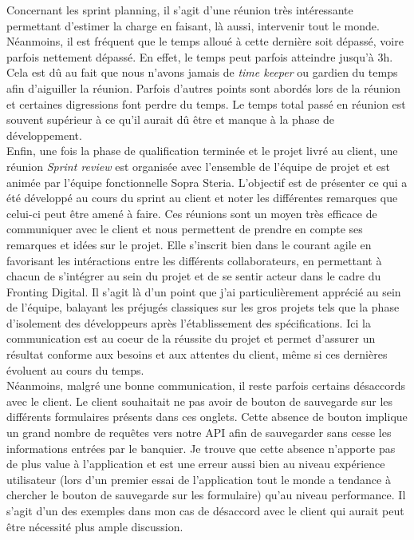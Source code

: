 	Concernant les sprint planning, il s'agit d'une réunion très intéressante permettant d'estimer la charge en faisant, là aussi, intervenir tout le monde. Néanmoins, il est fréquent que le temps alloué à cette dernière soit dépassé, voire parfois nettement dépassé. En effet, le temps peut parfois atteindre jusqu'à 3h. Cela est dû au fait que nous n'avons jamais de \textit{time keeper} ou gardien du temps afin d'aiguiller la réunion. Parfois d'autres points sont abordés lors de la réunion et certaines digressions font perdre du temps. Le temps total passé en réunion est souvent supérieur à ce qu'il aurait dû être et manque à la phase de développement. \\
	
	Enfin, une fois la phase de qualification terminée et le projet livré au client, une réunion \textit{Sprint review} est organisée avec l'ensemble de l'équipe de projet et est animée par l'équipe fonctionnelle Sopra Steria. L'objectif est de présenter ce qui a été développé au cours du sprint au client et noter les différentes remarques que celui-ci peut être amené à faire. Ces réunions sont un moyen très efficace de communiquer avec le client et nous permettent de prendre en compte ses remarques et idées sur le projet. Elle s'inscrit bien dans le courant agile en favorisant les intéractions entre les différents collaborateurs, en permettant à chacun de s'intégrer au sein du projet et de se sentir acteur dans le cadre du Fronting Digital. Il s'agit là d'un point que j'ai particulièrement apprécié au sein de l'équipe, balayant les préjugés classiques sur les gros projets tels que la phase d'isolement des développeurs après l'établissement des spécifications. Ici la communication est au coeur de la réussite du projet et permet d'assurer un résultat conforme aux besoins et aux attentes du client, même si ces dernières évoluent au cours du temps. \\
	
	Néanmoins, malgré une bonne communication, il reste parfois certains désaccords avec le client. Le client souhaitait ne pas avoir de bouton de sauvegarde sur les différents formulaires présents dans ces onglets. Cette absence de bouton implique un grand nombre de requêtes vers notre API afin de sauvegarder sans cesse les informations entrées par le banquier. Je trouve que cette absence n'apporte pas de plus value à l'application et est une erreur aussi bien au niveau expérience utilisateur (lors d'un premier essai de l'application tout le monde a tendance à chercher le bouton de sauvegarde sur les formulaire) qu'au niveau performance. Il s'agit d'un des exemples dans mon cas de désaccord avec le client qui aurait peut être nécessité plus ample discussion.